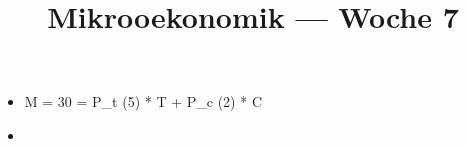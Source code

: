 \documentclass[a4paper]{article}
\title{\textbf{Mikrooekonomik — Woche 7}}
\begin{document}
    \maketitle
    
    
\begin{itemize}
    \item M = 30 = P_t (5) * T + P_c (2) * C
    \item 
\end{itemize}
\end{document}
